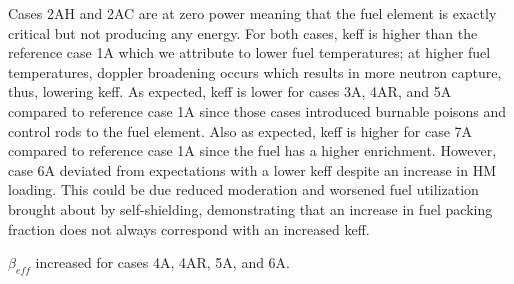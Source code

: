 Cases 2AH and 2AC are at zero power meaning that the fuel element is exactly 
critical but not producing any energy. 
For both cases, keff is higher than the reference case 1A which we attribute to 
lower fuel temperatures; at higher fuel temperatures, doppler broadening occurs 
which results in more neutron capture, thus, lowering keff. 
As expected, keff is lower for cases 3A, 4AR, and 5A compared to reference case 
1A since those cases introduced burnable poisons and control rods to the fuel 
element. 
Also as expected, keff is higher for case 7A compared to reference case 1A since 
the fuel has a higher enrichment. 
However, case 6A deviated from expectations with a lower keff despite an increase 
in \gls{HM} loading. 
This could be due reduced moderation and worsened fuel utilization brought 
about by self-shielding, demonstrating that an increase in fuel packing 
fraction does not always correspond with an increased keff. 

$\beta_{eff}$ increased for cases 4A, 4AR, 5A, and 6A.  
